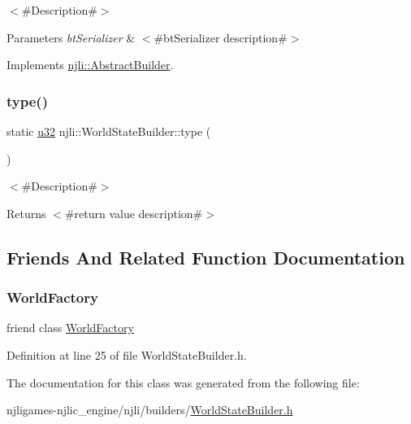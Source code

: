 $<$\#\+Description\#$>$


\begin{DoxyParams}{Parameters}
{\em bt\+Serializer} & $<$\#bt\+Serializer description\#$>$ \\
\hline
\end{DoxyParams}


Implements \mbox{\hyperlink{classnjli_1_1_abstract_builder_ab66b774e02ccb9da554c9aab7fa6d981}{njli\+::\+Abstract\+Builder}}.

\mbox{\label{classnjli_1_1_world_state_builder_a8aa60769d6ddf964215171b23ac08d4f}} 
\subsubsection{\texorpdfstring{type()}{type()}}
{\footnotesize\ttfamily static \mbox{\hyperlink{_util_8h_a10e94b422ef0c20dcdec20d31a1f5049}{u32}} njli\+::\+World\+State\+Builder\+::type (\begin{DoxyParamCaption}{ }\end{DoxyParamCaption})\hspace{0.3cm}{\ttfamily [static]}}

$<$\#\+Description\#$>$

\begin{DoxyReturn}{Returns}
$<$\#return value description\#$>$ 
\end{DoxyReturn}


\subsection{Friends And Related Function Documentation}
\mbox{\label{classnjli_1_1_world_state_builder_acb96ebb09abe8f2a37a915a842babfac}} 
\subsubsection{\texorpdfstring{World\+Factory}{WorldFactory}}
{\footnotesize\ttfamily friend class \mbox{\hyperlink{classnjli_1_1_world_factory}{World\+Factory}}\hspace{0.3cm}{\ttfamily [friend]}}



Definition at line 25 of file World\+State\+Builder.\+h.



The documentation for this class was generated from the following file\+:\begin{DoxyCompactItemize}
\item 
njligames-\/njlic\+\_\+engine/njli/builders/\mbox{\hyperlink{_world_state_builder_8h}{World\+State\+Builder.\+h}}\end{DoxyCompactItemize}
